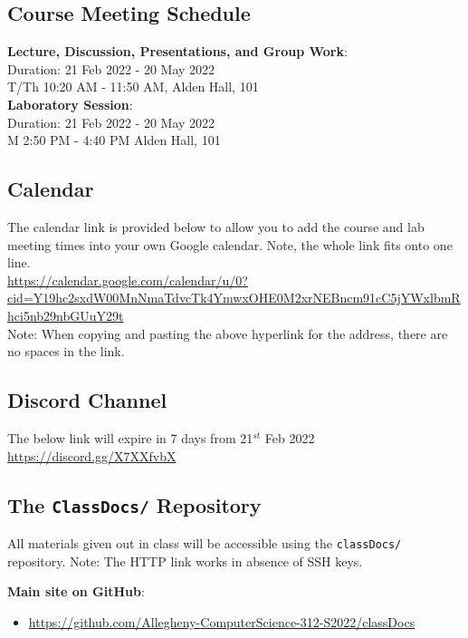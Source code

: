 \documentclass[11pt]{article} %
\begin{document}
\subsection*{\textbf{Course Meeting Schedule}}


\textbf{Lecture, Discussion, Presentations, and Group Work}:\\
\noindent
Duration: 21 Feb 2022 - 20 May 2022\\
T/Th 10:20 AM - 11:50 AM, Alden Hall, 101\\


\noindent
\textbf{Laboratory Session}:\\
Duration: 21 Feb 2022 - 20 May 2022\\
M 2:50 PM - 4:40 PM Alden Hall, 101\\





\subsection*{\textbf{Calendar}}
The calendar link is provided below to allow you to add the course and lab meeting times into your own Google calendar. Note, the whole link fits onto one line.\\
{\footnotesize
\url{https://calendar.google.com/calendar/u/0?cid=Y19hc2sxdW00MnNmaTdvcTk4YmwxOHE0M2xrNEBncm91cC5jYWxlbmRhci5nb29nbGUuY29t} }\\
Note: When copying and pasting the above hyperlink for the address, there are no spaces in the link.


\subsection*{\textbf{Discord Channel}}
The below link will expire in 7 days from 21$^{st}$ Feb 2022\\
{\footnotesize
\url{https://discord.gg/X7XXfvbX} }




\subsection*{\textbf{The {\tt ClassDocs/} Repository}}
All materials given out in class will be accessible using the {\tt classDocs/} repository. Note: The HTTP link works in absence of SSH keys.

\textbf{Main site on GitHub}: 
	\begin{itemize}
		\item \footnotesize \url{https://github.com/Allegheny-ComputerScience-312-S2022/classDocs}
	\end{itemize}
\end{document}
